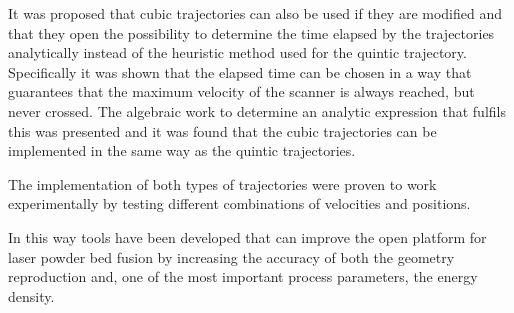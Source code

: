 It was proposed that cubic trajectories can also be used if they are modified and that they open the possibility to determine the time elapsed by the trajectories analytically instead of the heuristic method used for the quintic trajectory. Specifically it was shown that the elapsed time can be chosen in a way that guarantees that the maximum velocity of the scanner is always reached, but never crossed. The algebraic work to determine an analytic expression that fulfils this was presented and it was found that the cubic trajectories can be implemented in the same way as the quintic trajectories. 

The implementation of both types of trajectories were proven to work experimentally by testing different combinations of velocities and positions.

In this way tools have been developed that can improve the open platform for laser powder bed fusion by increasing the accuracy of both the geometry reproduction and, one of the most important process parameters, the energy density.

